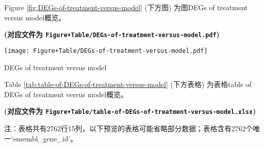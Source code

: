 \documentclass[
]{article}
\begin{document}
Figure \ref{fig:DEGs-of-treatment-versus-model} (下方图) 为图DEGs of treatment versus model概览。

\textbf{(对应文件为 \texttt{Figure+Table/DEGs-of-treatment-versus-model.pdf})}

\def\@captype{figure}
\begin{center}
\texttt{[image: Figure+Table/DEGs-of-treatment-versus-model.pdf]}
\caption{DEGs of treatment versus model}\label{fig:DEGs-of-treatment-versus-model}
\end{center}

Table \ref{tab:table-of-DEGs-of-treatment-versus-model} (下方表格) 为表格table of DEGs of treatment versus model概览。

\textbf{(对应文件为 \texttt{Figure+Table/table-of-DEGs-of-treatment-versus-model.xlsx})}

\begin{center}\begin{tcolorbox}[colback=gray!10, colframe=gray!50, width=0.9\linewidth, arc=1mm, boxrule=0.5pt]注：表格共有2762行15列，以下预览的表格可能省略部分数据；表格含有2762个唯一`ensembl\_gene\_id'。
\end{tcolorbox}
\end{center}
\end{document}
